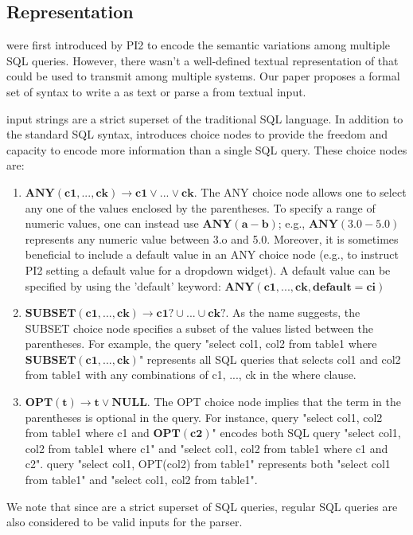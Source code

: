 \subsection{\difftree Representation}

\difftrees were first introduced by PI2\cite{chen2022pi2} to encode the semantic variations among multiple SQL queries. However, there wasn't a well-defined textual representation of \difftree that could be used to transmit among multiple systems. Our paper proposes a formal set of syntax to write a \difftree as text or parse a \difftree from textual input.

\difftree input strings are a strict superset of the traditional SQL language. In addition to the standard SQL syntax, \difftree introduces choice nodes to provide the freedom and capacity to encode more information than a single SQL query. These choice nodes are:

\begin{enumerate}
\item $\mathbf{ANY(c1, ..., ck) \rightarrow c1 \vee ... \vee ck}$. The ANY choice node allows one to select any one of the values enclosed by the parentheses. To specify a range of numeric values, one can instead use $\mathbf{ANY(a - b)}$; e.g., $\mathbf{ANY(3.0 - 5.0)}$ represents any numeric value between 3.o and 5.0. Moreover, it is sometimes beneficial to include a default value in an ANY choice node (e.g., to instruct PI2 setting a default value for a dropdown widget). A default value can be specified by using the 'default' keyword: $\mathbf{ANY(c1, ..., ck, default=ci)}$
\item $\mathbf{SUBSET(c1, ..., ck) \rightarrow c1? \cup ... \cup ck?}$. As the name suggests, the SUBSET choice node specifies a subset of the values listed between the parentheses. For example, the query "select col1, col2 from table1 where $\mathbf{SUBSET(c1, ..., ck)}$" represents all SQL queries that selects col1 and col2 from table1 with any combinations of c1, ..., ck in the where clause.
\item $\mathbf{OPT(t) \rightarrow t \vee NULL}$. The OPT choice node implies that the term in the parentheses is optional in the query. For instance, \difftree query "select col1, col2 from table1 where c1 and $\mathbf{OPT(c2)}$" encodes both SQL query "select col1, col2 from table1 where c1" and "select col1, col2 from table1 where c1 and c2". \difftree query "select col1, OPT(col2) from table1" represents both "select col1 from table1" and "select col1, col2 from table1".
\end{enumerate}

We note that since \difftrees are a strict superset of SQL queries, regular SQL queries are also considered to be valid inputs for the \difftree parser.